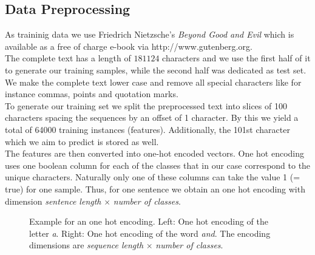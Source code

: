 \documentclass[11pt,a4paper,bibliography=totocnumbered,listof=totocnumbered]{scrartcl}
\begin{document}
\subsection{Data Preprocessing}
As traininig data we use Friedrich Nietzsche’s \textit{Beyond Good and Evil} which is available as a free of charge e-book via http://www.gutenberg.org. \\
The complete text has a length of $181124$ characters and we use the first half of it to generate our training samples, while the second half was dedicated as test set. We make the complete text lower case and remove all special characters like for instance commas, points and quotation marks. \\
To generate our training set we split the preprocessed text into slices of 100 characters spacing the sequences by an offset of 1 character. By this we yield a total of 64000 training instances (features). Additionally, the 101st character which we aim to predict is stored as well. \\
The features are then converted into one-hot encoded vectors. One hot encoding uses one boolean column for each of the classes that in our case correspond to the unique characters. Naturally only one of these columns can take the value 1 (= true) for one sample. Thus, for one sentence we obtain an one hot encoding with dimension \textit{sentence length} $\times$ \textit{number of classes}.

	\begin{figure}[h!] 
		\label{fig:onehot}
		\caption{Example for an one hot encoding. Left: One hot encoding of the letter \textit{a}. Right: One hot encoding of the word \textit{and}. The encoding dimensions are \textit{sequence length} $\times$ \textit{number of classes}.}
	\end{figure}
\end{document}
